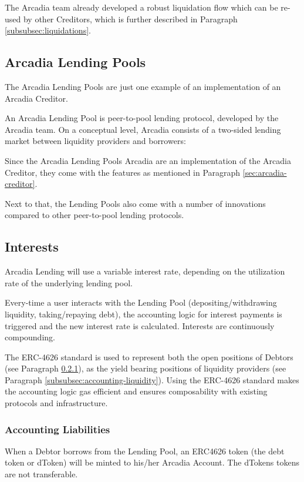 \documentclass[sigconf,nonacm]{acmart}
\begin{document}
The Arcadia team already developed a robust liquidation flow which can be re-used by other Creditors,
which is further described in Paragraph \ref{subsubsec:liquidations}.

\subsection{Arcadia Lending Pools}
The Arcadia Lending Pools are just one example of an implementation of an Arcadia Creditor.

An Arcadia Lending Pool is peer-to-pool lending protocol, developed by the Arcadia team.
On a conceptual level, Arcadia consists of a two-sided lending market between liquidity providers and borrowers:

Since the Arcadia Lending Pools Arcadia are an implementation of the Arcadia Creditor,
they come with the features as mentioned in Paragraph \ref{sec:arcadia-creditor}.

Next to that, the Lending Pools also come with a number of innovations compared to other peer-to-pool lending protocols.

\subsection{Interests}
Arcadia Lending will use a variable interest rate, depending on the utilization rate of the underlying lending pool.

Every-time a user interacts with the Lending Pool (depositing/withdrawing liquidity, taking/repaying debt),
the accounting logic for interest payments is triggered and the new interest rate is calculated.
Interests are continuously compounding.

The ERC-4626 standard is used to represent both the open positions of Debtors (see Paragraph \ref{subsubsec:accounting-liabilities}),
as the yield bearing positions of liquidity providers (see Paragraph \ref{subsubsec:accounting-liquidity}).
Using the ERC-4626 standard makes the accounting logic gas efficient and ensures composability with existing protocols and infrastructure.

\subsubsection{Accounting Liabilities}
\label{subsubsec:accounting-liabilities}
When a Debtor borrows from the Lending Pool,
an ERC4626 token (the debt token or dToken) will be minted to his/her Arcadia Account.
The dTokens tokens are not transferable.
\end{document}
